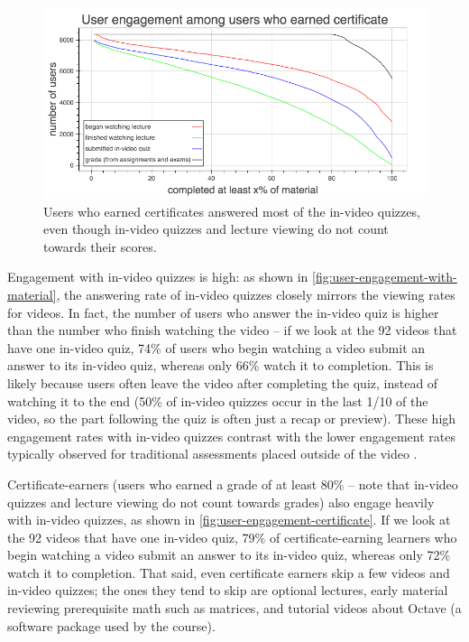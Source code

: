 \documentclass{sigchi}
\begin{document}
\begin{figure}
\includegraphics[width=1.0\columnwidth]{user-engagement-certificate}
\caption{Users who earned certificates answered most of the in-video quizzes, even though in-video quizzes and lecture viewing do not count towards their scores.}
\label{fig:user-engagement-certificate}
\end{figure}

Engagement with in-video quizzes is high: as shown in \autoref{fig:user-engagement-with-material}, the answering rate of in-video quizzes closely mirrors the viewing rates for videos. In fact, the number of users who answer the in-video quiz is higher than the number who finish watching the video -- if we look at the 92 videos that have one in-video quiz, 74\% of users who begin watching a video submit an answer to its in-video quiz, whereas only 66\% watch it to completion. This is likely because users often leave the video after completing the quiz, instead of watching it to the end (50\% of in-video quizzes occur in the last 1/10 of the video, so the part following the quiz is often just a recap or preview). These high engagement rates with in-video quizzes contrast with the lower engagement rates typically observed for traditional assessments placed outside of the video \cite{renedisengagement} \cite{ashton}.


Certificate-earners (users who earned a grade of at least 80\% -- note that in-video quizzes and lecture viewing do not count towards grades) also engage heavily with in-video quizzes, as shown in \autoref{fig:user-engagement-certificate}. If we look at the 92 videos that have one in-video quiz, 79\% of certificate-earning learners who begin watching a video submit an answer to its in-video quiz, whereas only 72\% watch it to completion. That said, even certificate earners skip a few videos and in-video quizzes; the ones they tend to skip are optional lectures, early material reviewing prerequisite math such as matrices, and tutorial videos about Octave (a software package used by the course).
\end{document}
